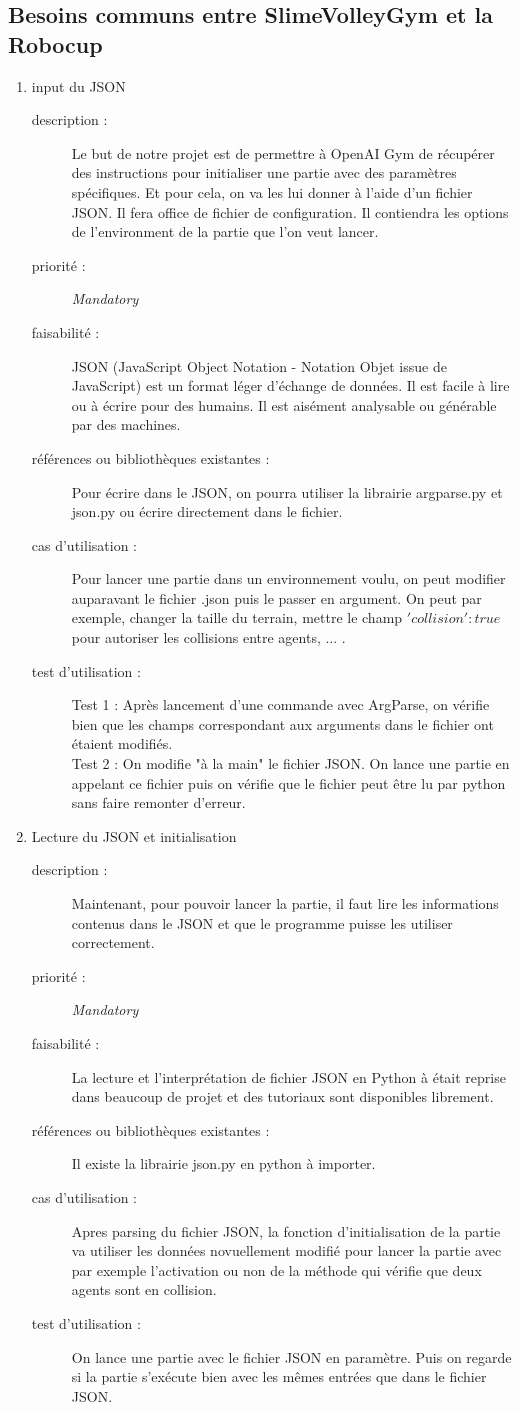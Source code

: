 \documentclass[11pt, a4paper]{article}
\newcommand{\besoinItem}[7]{
    \item #1
    \begin{description}
        \item[description :]
        #2 
        \item[priorité :]
        #3
        \item[faisabilité :]
        #4
        \item[références ou bibliothèques existantes :]
        #5
        \item[cas d'utilisation :]
        #6
        \item[test d'utilisation :]      
        #7 
    \end{description}
}
\begin{document}
\subsection{Besoins communs entre SlimeVolleyGym et la Robocup}
\begin{enumerate}
\besoinItem{input du JSON}
{Le but de notre projet est de permettre à OpenAI Gym de récupérer des instructions pour initialiser
une partie avec des paramètres spécifiques. Et pour cela, on va les lui donner à l'aide d'un fichier JSON.
Il fera office de fichier de configuration.
Il contiendra les options de l'environment de la partie que l'on veut lancer.}
{\textit{Mandatory}}
{JSON (JavaScript Object Notation - Notation Objet issue de JavaScript) est un format léger 
d'échange de données. Il est facile à lire ou à écrire pour des humains. 
Il est aisément analysable ou générable par des machines.}
{Pour écrire dans le JSON, on pourra utiliser la librairie argparse.py\cite{argparse.py} et json.py\cite{json.py} 
ou écrire directement dans le fichier.}
{Pour lancer une partie dans un environnement voulu, on peut modifier auparavant le fichier .json puis le passer en argument. On peut par exemple, changer la taille du terrain, mettre le champ $'collision': true$ pour autoriser les collisions entre agents, ... .}
{Test 1 : Après lancement d'une commande avec ArgParse, on vérifie bien que les champs correspondant aux arguments dans le fichier ont étaient modifiés.\\
 Test 2 : On modifie "à la main" le fichier JSON. On lance une partie en appelant ce fichier puis on vérifie que le fichier peut être lu par python sans faire remonter d'erreur.}

\besoinItem{Lecture du JSON et initialisation}
{Maintenant, pour pouvoir lancer la partie, il faut lire les informations contenus
dans le JSON et que le programme puisse les utiliser correctement.}
{\textit{Mandatory}}
{La lecture et l'interprétation de fichier JSON en Python à était reprise dans beaucoup de projet et des tutoriaux sont disponibles librement\cite{Tuto-JSON}. }
{Il existe la librairie json.py\cite{json.py} en python à importer.}
{Apres parsing du fichier JSON, la fonction d'initialisation de la partie va utiliser les données novuellement modifié pour lancer la partie avec par exemple l'activation ou non de la méthode qui vérifie que deux agents sont en collision.}
{On lance une partie avec le fichier JSON en paramètre. Puis on regarde si la partie s'exécute bien avec les mêmes entrées que dans le fichier JSON.}


\end{enumerate}
\end{document}
